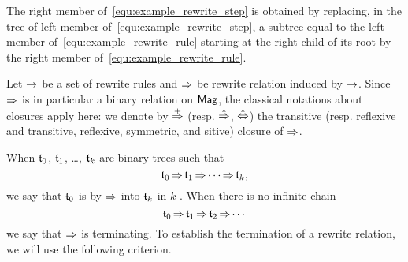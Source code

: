 The right member of~\eqref{equ:example_rewrite_step} is obtained by
replacing, in the tree of left member
of~\eqref{equ:example_rewrite_step}, a subtree equal to the left
member of~\eqref{equ:example_rewrite_rule} starting at the right child
of its root by the right member of~\eqref{equ:example_rewrite_rule}.
\medbreak

Let $\operatorname{\to}$ be a set of rewrite rules and $\operatorname{\Rightarrow}$ be rewrite
relation induced by $\operatorname{\to}$. Since $\operatorname{\Rightarrow}$ is in particular a
binary relation on $\mathsf{Mag}$, the classical notations about closures apply
here: we denote by $\operatorname{\overset{+}{\operatorname{\Rightarrow}}}$ (resp. $\operatorname{\overset{\ast}{\operatorname{\Rightarrow}}}$,
$\operatorname{\overset{\ast}{\Leftrightarrow}}$) the transitive (resp. reflexive and transitive,
reflexive, symmetric, and sitive) closure of $\operatorname{\Rightarrow}$.
\medbreak

When $\mathfrak{t}_0$, $\mathfrak{t}_1$, \dots, $\mathfrak{t}_k$ are binary trees such that
\begin{equation}
    \mathfrak{t}_0 \operatorname{\Rightarrow} \mathfrak{t}_1 \operatorname{\Rightarrow} \cdots \operatorname{\Rightarrow} \mathfrak{t}_k,
\end{equation}
we say that $\mathfrak{t}_0$ is  by $\operatorname{\Rightarrow}$ into $\mathfrak{t}_k$
in $k$ . When there is no infinite chain
\begin{equation} \label{equ:infinite_chain}
    \mathfrak{t}_0 \operatorname{\Rightarrow} \mathfrak{t}_1 \operatorname{\Rightarrow} \mathfrak{t}_2 \operatorname{\Rightarrow} \cdots
\end{equation}
we say that $\operatorname{\Rightarrow}$ is terminating. To establish the termination
of a rewrite relation, we will use the following criterion.
\medbreak

